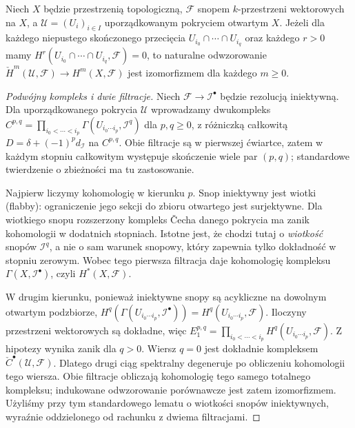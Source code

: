 \begin{twierdzenie}
\label{thm:leray-sheaf-v12}
Niech $X$ będzie przestrzenią topologiczną,
$\mathcal F$ snopem $k$-przestrzeni wektorowych na $X$,
a $\mathcal U=(U_i)_{i\in I}$ uporządkowanym pokryciem otwartym $X$.
Jeżeli dla każdego niepustego skończonego przecięcia
$U_{i_0}\cap\cdots\cap U_{i_q}$ oraz każdego $r>0$ mamy
$H^r(U_{i_0}\cap\cdots\cap U_{i_q},\mathcal F)=0$,
to naturalne odwzorowanie
$\check H^m(\mathcal U,\mathcal F)\to H^m(X,\mathcal F)$
jest izomorfizmem dla każdego $m\ge0$.
\end{twierdzenie}
\begin{proof}[Podwójny kompleks i dwie filtracje]
Niech $\mathcal F\to\mathcal I^\bullet$ będzie rezolucją
iniektywną. Dla uporządkowanego pokrycia $\mathcal U$
wprowadzamy dwukompleks
$C^{p,q}=\prod_{i_0<\cdots<i_p}
\Gamma(U_{i_0\cdots i_p},\mathcal I^q)$ dla $p,q\ge0$,
z różniczką całkowitą
$D=\delta+(-1)^p d_{\mathcal I}$ na $C^{p,q}$.
Obie filtracje są w pierwszej ćwiartce, zatem w każdym
stopniu całkowitym występuje skończenie wiele par $(p,q)$;
standardowe twierdzenie o zbieżności ma tu zastosowanie.

Najpierw liczymy kohomologię w kierunku $p$. Snop
iniektywny jest wiotki (flabby): ograniczenie jego sekcji
do zbioru otwartego jest surjektywne. Dla wiotkiego snopu
rozszerzony kompleks \v{C}echa danego pokrycia ma
zanik kohomologii w dodatnich stopniach. Istotne jest,
że chodzi tutaj o \emph{wiotkość} snopów $\mathcal I^q$,
a nie o sam warunek snopowy, który zapewnia tylko
dokładność w stopniu zerowym. Wobec tego pierwsza
filtracja daje kohomologię kompleksu
$\Gamma(X,\mathcal I^\bullet)$, czyli $H^*(X,\mathcal F)$.

W drugim kierunku, ponieważ iniektywne snopy są
acykliczne na dowolnym otwartym podzbiorze,
$H^q(\Gamma(U_{i_0\cdots i_p},\mathcal I^\bullet))
=H^q(U_{i_0\cdots i_p},\mathcal F)$.
Iloczyny przestrzeni wektorowych są dokładne,
więc $E_1^{p,q}=\prod_{i_0<\cdots<i_p}
H^q(U_{i_0\cdots i_p},\mathcal F)$.
Z hipotezy wynika zanik dla $q>0$.
Wiersz $q=0$ jest dokładnie kompleksem
$\check C^\bullet(\mathcal U,\mathcal F)$.
Dlatego drugi ciąg spektralny degeneruje po obliczeniu
kohomologii tego wiersza. Obie filtracje obliczają
kohomologię tego samego totalnego kompleksu;
indukowane odwzorowanie porównawcze jest zatem izomorfizmem.
Użyliśmy przy tym standardowego lematu o wiotkości
snopów iniektywnych, wyraźnie oddzielonego od rachunku
z dwiema filtracjami.
\end{proof}

